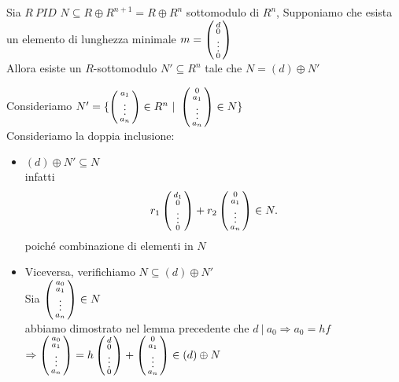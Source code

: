 \documentclass[12px]{article}
\begin{document}
\begin{lemm}[Esercizio]
	Sia $R\ PID$  $N\subseteq R\oplus R^{n+1} = R\oplus R^n$ sottomodulo di  $R^n$, Supponiamo che esista un elemento di lunghezza minimale  $m = \left(\begin{smallmatrix}d\\0\\\vdots\\0\end{smallmatrix}\right)$\\
	Allora esiste  un $R$-sottomodulo $N'\subseteq R^n$  tale che $N = (d)\oplus N'$
\end{lemm}
\begin{dimo}
	Consideriamo $N' = \lbrace\left(\begin{smallmatrix}a_1\\\vdots\\a_n\end{smallmatrix}\right)\in R^n\ | \ \left(\begin{smallmatrix}0\\a_1\\\vdots\\a_n\end{smallmatrix}\right)\in N\rbrace$ \\
	Consideriamo la doppia inclusione:
	\begin{itemize}
		\item \Lbrac $(d)\oplus N'\subseteq N$\\
			infatti
			 \[
				 r_1\left(\begin{smallmatrix}d_1\\ 0 \\ \vdots \\ 0 \end{smallmatrix}\right) + r_2\left(\begin{smallmatrix}0\\a_1\\\vdots\\a_n\end{smallmatrix}\right) \in N
			.\] 
			poiché combinazione di elementi in $N$\\
		\item Viceversa, verifichiamo $N\subseteq (d)\oplus N'$ \\
			Sia $\left(\begin{smallmatrix}a_0\\a_1\\\vdots\\a_n\end{smallmatrix}\right)\in N$\\
			abbiamo dimostrato nel lemma precedente che $d\ | \ a_0 \Rightarrow  a_0 = hf$ \\
			$ \Rightarrow  \left(\begin{smallmatrix}a_0\\a_1\\\vdots\\a_n\end{smallmatrix}\right) = h\left(\begin{smallmatrix}d\\0\\\vdots\\0\end{smallmatrix}\right) + \left(\begin{smallmatrix}0\\a_1\\\vdots\\a_n\end{smallmatrix}\right)\in (d)\oplus N$
	\end{itemize}
\end{dimo}
\end{document}
